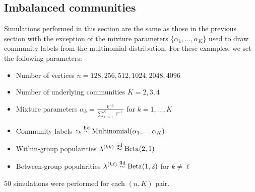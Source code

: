 \documentclass[12pt]{article}
\providecommand{\tightlist}{%
  \setlength{\itemsep}{0pt}\setlength{\parskip}{0pt}}
\begin{document}
\hypertarget{imbalanced-communities}{%
\subsection{Imbalanced communities}\label{imbalanced-communities}}

Simulations performed in this section are the same as those in the
previous section with the exception of the mixture parameters
\(\{\alpha_1, ..., \alpha_K\}\) used to draw community labels from the
multinomial distribution. For these examples, we set the following
parameters:

\begin{itemize}
\tightlist
\item
  Number of vertices \(n = 128, 256, 512, 1024, 2048, 4096\)
\item
  Number of underlying communities \(K = 2, 3, 4\)
\item
  Mixture parameters \(\alpha_k = \frac{k^{-1}}{\sum_{\ell=1}^K \ell^{-1}}\)
  for \(k = 1, ..., K\)
\item
  Community labels
  \(z_k \stackrel{\text{iid}}{\sim} \mathrm{Multinomial}(\alpha_1, ..., \alpha_K)\)
\item
  Within-group popularities
  \(\lambda^{(kk)} \stackrel{\text{iid}}{\sim} \mathrm{Beta}(2, 1)\)
\item
  Between-group popularities
  \(\lambda^{(k \ell)} \stackrel{\text{iid}}{\sim} \mathrm{Beta}(1, 2)\) for
  \(k \neq \ell\)
\end{itemize}

\(50\) simulations were performed for each \((n, K)\) pair.

\end{document}
